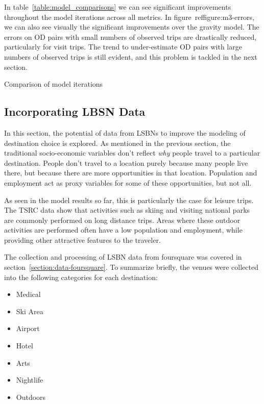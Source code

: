 In table~\ref{table:model_comparisons} we can see significant improvements throughout the model iterations across all metrics. In figure~ref{figure:m3-errors}, we can also see visually the significant improvements over the gravity model. The errors on OD pairs with small numbers of observed trips are drastically reduced, particularly for visit trips. The trend to under-estimate OD pairs with large numbers of observed trips is still evident, and this problem is tackled in the next section. 

\begin{table}[H]
\centering
\caption{Comparison of model iterations}
\label{table:model_comparisons}


\end{table}

\subsection{Incorporating LBSN Data}

In this section, the potential of data from LSBNs to improve the modeling of destination choice is explored. As mentioned in the previous section, the traditional socio-economic variables don't reflect \textit{why} people travel to a particular destination. People don't travel to a location purely because many people live there, but because there are more opportunities in that location. Population and employment act as proxy variables for some of these opportunities, but not all. 

As seen in the model results so far, this is particularly the case for leisure trips. The TSRC data show that activities such as skiing and visiting national parks are commonly performed on long distance trips. Areas where these outdoor activities are performed often have a low population and employment, while providing other attractive features to the traveler.

The collection and processing of LSBN data from foursquare was covered in section~\ref{section:data-foursquare}. To summarize briefly, the venues were collected into the following categories for each destination:
\begin{multicols}{2}
\raggedcolumns
\begin{itemize}
\item Medical
\item Ski Area
\item Airport
\item Hotel
\item Arts
\item Nightlife
\item Outdoors
\end{itemize}
\end{multicols}

